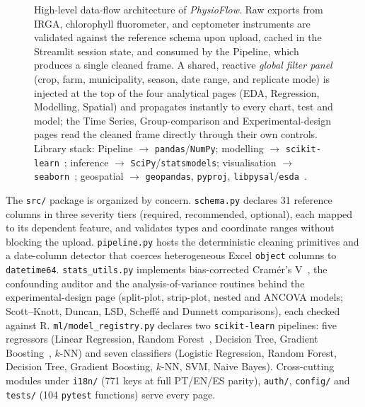 \documentclass[a4paper,fleqn]{cas-dc}
\begin{document}
\begin{figure}[tp]
{%
}
\caption{High-level data-flow architecture of \emph{PhysioFlow}. Raw exports from IRGA, chlorophyll fluorometer, and ceptometer instruments are validated against the reference schema upon upload, cached in the Streamlit session state, and consumed by the Pipeline, which produces a single cleaned frame. A shared, reactive \emph{global filter panel} (crop, farm, municipality, season, date range, and replicate mode) is injected at the top of the four analytical pages (EDA, Regression, Modelling, Spatial) and propagates instantly to every chart, test and model; the Time Series, Group-comparison and Experimental-design pages read the cleaned frame directly through their own controls. Library stack: Pipeline $\to$ \texttt{pandas}/\texttt{NumPy}; modelling $\to$ \texttt{scikit-learn}~\cite{Pedregosa2011}; inference $\to$ \texttt{SciPy}/\texttt{statsmodels}; visualisation $\to$ \texttt{seaborn}~\cite{Waskom2021,Hunter2007}; geospatial $\to$ \texttt{geopandas}, \texttt{pyproj}, \texttt{libpysal}/\texttt{esda}~\cite{Rey2010Pysal}.}\label{fig:architecture}
\end{figure}

The \texttt{src/} package is organized by concern. \texttt{schema.py} declares 31 reference columns in three severity tiers (required, recommended, optional), each mapped to its dependent feature, and validates types and coordinate ranges without blocking the upload. \texttt{pipeline.py} hosts the deterministic cleaning primitives and a date-column detector that coerces heterogeneous Excel \texttt{object} columns to \texttt{datetime64}. \texttt{stats\_utils.py} implements bias-corrected Cram\'er's V~\cite{Bergsma2013}, the confounding auditor and the analysis-of-variance routines behind the experimental-design page (split-plot, strip-plot, nested and ANCOVA models; Scott--Knott, Duncan, LSD, Scheff\'e and Dunnett comparisons), each checked against R. \texttt{ml/model\_registry.py} declares two \texttt{scikit-learn} pipelines: five regressors (Linear Regression, Random Forest~\cite{Breiman2001}, Decision Tree, Gradient Boosting~\cite{Friedman2001}, $k$-NN) and seven classifiers (Logistic Regression, Random Forest, Decision Tree, Gradient Boosting, $k$-NN, SVM, Naive Bayes). Cross-cutting modules under \texttt{i18n/} (771 keys at full PT/EN/ES parity), \texttt{auth/}, \texttt{config/} and \texttt{tests/} (104 \texttt{pytest} functions) serve every page.
\end{document}
